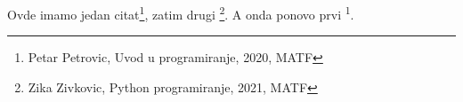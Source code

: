 \documentclass{article}
\begin{document}
Ovde imamo jedan citat\footnote{Petar Petrovic, Uvod u programiranje, 2020, MATF}, zatim drugi \footnote{Zika Zivkovic, Python programiranje, 2021, MATF}.
A onda ponovo prvi \textsuperscript{1}.
\end{document}
